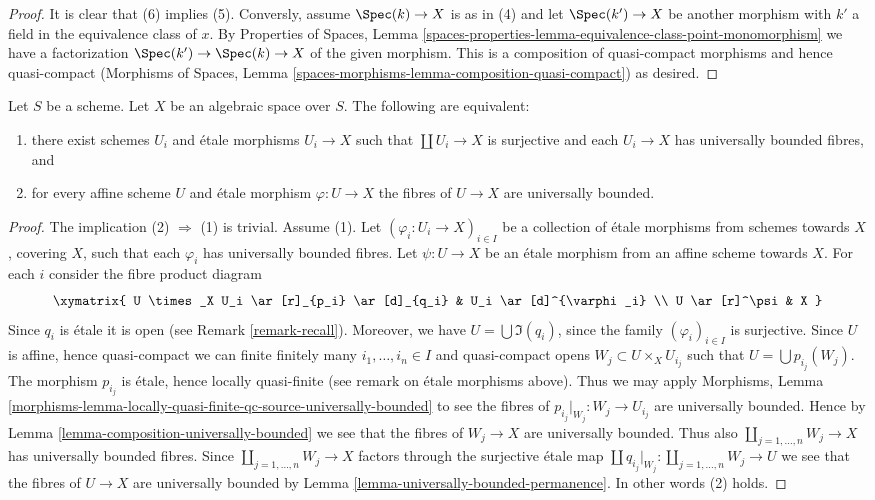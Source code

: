 \begin{proof}
\medskip\noindent
It is clear that (6) implies (5). Conversly, assume $\Spec(k) \to X$ is
as in (4) and let $\Spec(k') \to X$ be another morphism with $k'$ a
field in the equivalence class of $x$. By
Properties of Spaces, Lemma
\ref{spaces-properties-lemma-equivalence-class-point-monomorphism}
we have a factorization $\Spec(k') \to \Spec(k) \to X$ of the
given morphism. This is a composition of quasi-compact
morphisms and hence quasi-compact (Morphisms of Spaces,
Lemma \ref{spaces-morphisms-lemma-composition-quasi-compact}) as desired.
\end{proof}

\begin{lemma}
\label{lemma-U-universally-bounded}
Let $S$ be a scheme. Let $X$ be an algebraic space over $S$.
The following are equivalent:
\begin{enumerate}
\item there exist schemes $U_i$ and \'etale morphisms
$U_i \to X$ such that $\coprod U_i \to X$ is surjective and
each $U_i \to X$ has universally bounded fibres, and
\item for every affine scheme $U$ and \'etale morphism $\varphi : U \to X$
the fibres of $U \to X$ are universally bounded.
\end{enumerate}
\end{lemma}

\begin{proof}
The implication (2) $\Rightarrow$ (1) is trivial.
Assume (1). Let $(\varphi_i : U_i \to X)_{i \in I}$ be a collection of
\'etale morphisms from schemes towards $X$, covering $X$, such that
each $\varphi_i$ has universally bounded fibres.
Let $\psi : U \to X$ be an \'etale morphism from an affine scheme towards $X$.
For each $i$ consider the fibre product diagram
$$
\xymatrix{
U \times_X U_i \ar[r]_{p_i} \ar[d]_{q_i} & U_i \ar[d]^{\varphi_i} \\
U \ar[r]^\psi & X
}
$$
Since $q_i$ is \'etale it is open (see Remark \ref{remark-recall}).
Moreover, we have $U = \bigcup \Im(q_i)$, since the family
$(\varphi_i)_{i \in I}$ is surjective. Since $U$ is affine, hence quasi-compact
we can finite finitely many $i_1, \ldots, i_n \in I$ and quasi-compact
opens $W_j \subset U \times_X U_{i_j}$ such that
$U = \bigcup p_{i_j}(W_j)$.
The morphism $p_{i_j}$ is \'etale, hence locally quasi-finite
(see remark on \'etale morphisms above). Thus we may apply
Morphisms, Lemma
\ref{morphisms-lemma-locally-quasi-finite-qc-source-universally-bounded}
to see the fibres of $p_{i_j}|_{W_j} : W_j \to U_{i_j}$ are universally
bounded. Hence by
Lemma \ref{lemma-composition-universally-bounded}
we see that the fibres of $W_j \to X$ are universally bounded.
Thus also $\coprod_{j = 1, \ldots, n} W_j \to X$ has universally
bounded fibres. Since $\coprod_{j = 1, \ldots, n} W_j \to X$ factors
through the surjective \'etale map
$\coprod q_{i_j}|_{W_j} : \coprod_{j = 1, \ldots, n} W_j \to U$ we
see that the fibres of $U \to X$ are universally bounded by
Lemma \ref{lemma-universally-bounded-permanence}.
In other words (2) holds.
\end{proof}


